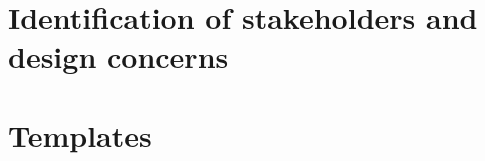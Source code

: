 \chapter{Identification of stakeholders and design concerns} \label{chp:identification-of-stakeholders-and-design-concerns}
	\begin{comment}
		An SDD shall identify the design stakeholders for the design subject.
		An SDD shall identify the design concerns of each identified design stakeholder.
		An SDD shall address each identified design concern.
		NOTE—An SDD can be used to satisfy the content guidelines for several types of design description as defined in
		ISO/IEC 15289:2006 [B25], by identifying their content guidelines as design concerns. The types of design
		descriptions are as follows: database design description (10.14),6 database detailed design description (10.15), highlevel
		software design description (10.22), interface description (10.27), low-level software design description (10.29),
		system description (10.71), and system element description (10.72).
	\end{comment}


\chapter{Templates} \label{Template viewpoint-view design label}
%
















